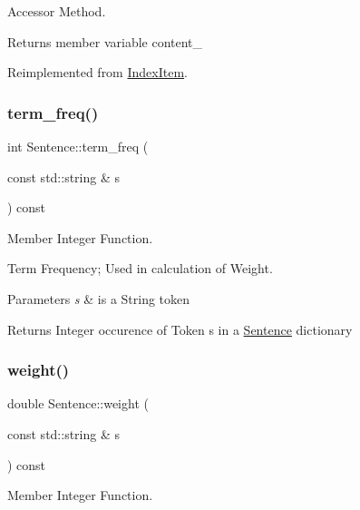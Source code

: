 Accessor Method. 

Returns member variable content\+\_\+ 

Reimplemented from \hyperlink{class_index_item_aa910a42ef4f6d7087297ac7fb8cf4a6c}{Index\+Item}.

\mbox{\label{class_sentence_aa615a21b45de69ba4a1f0fa257a85ccd}} 
\subsubsection{\texorpdfstring{term\+\_\+freq()}{term\_freq()}}
{\footnotesize\ttfamily int Sentence\+::term\+\_\+freq (\begin{DoxyParamCaption}\item[{const std\+::string \&}]{s }\end{DoxyParamCaption}) const\hspace{0.3cm}{\ttfamily [private]}}



Member Integer Function. 

Term Frequency; Used in calculation of Weight.


\begin{DoxyParams}{Parameters}
{\em s} & is a String token \\
\hline
\end{DoxyParams}
\begin{DoxyReturn}{Returns}
Integer occurence of Token s in a \hyperlink{class_sentence}{Sentence} dictionary 
\end{DoxyReturn}
\mbox{\label{class_sentence_ac7084c1822710975f94ed8a30ac73c2c}} 
\subsubsection{\texorpdfstring{weight()}{weight()}}
{\footnotesize\ttfamily double Sentence\+::weight (\begin{DoxyParamCaption}\item[{const std\+::string \&}]{s }\end{DoxyParamCaption}) const\hspace{0.3cm}{\ttfamily [private]}}



Member Integer Function. 

